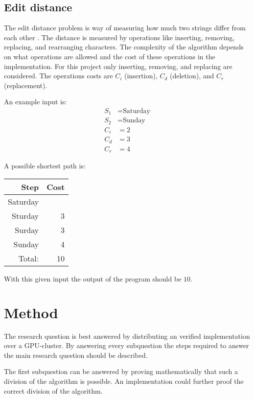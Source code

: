 \documentclass{sig-alternate-br}
\begin{document}
\subsection{Edit distance}
The edit distance problem is way of measuring how much two strings differ from each other \cite{Navarro:2001:GTA:375360.375365}.
The distance is measured by operations like inserting, removing, replacing, and rearranging characters.
The complexity of the algorithm depends on what operations are allowed and the cost of these operations in the implementation.
For this project only inserting, removing, and replacing are considered.
The operations costs are $C_i$ (insertion), $C_d$ (deletion), and $C_r$ (replacement).

An example input is:
\begin{align*}
S_1 &= \text{Saturday}\\
S_2 &= \text{Sunday}\\
C_i &= 2\\
C_d &= 3\\
C_r &= 4
\end{align*}

A possible shortest path is:

\begin{center}
\begin{tabular}{rr}
\textbf{Step} & \textbf{Cost} \\ \hline
Saturday & \\
Sturday & 3\\
Surday  & 3\\
Sunday  & 4\\ \hline
Total:  & 10\\
\end{tabular}
\end{center}

With this given input the output of the program should be $10$.

\section{Method}
The research question is best answered by distributing an verified implementation over a GPU-cluster.
By answering every subquestion the steps required to answer the main research question should be described.

The first subquestion can be answered by proving mathematically that such a division of the algorithm is possible.
An implementation could further proof the correct division of the algorithm.
\end{document}
